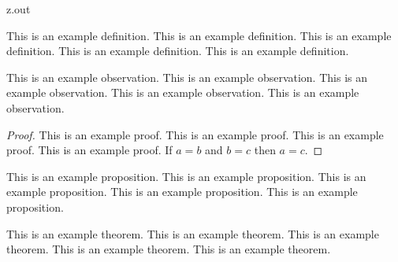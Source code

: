 \begin{VerbatimOut}{z.out}

\index{\verb+\begin{definition}+}
\begin{definition}
  This is an example definition.
  This is an example definition.
  This is an example definition.
  This is an example definition.
  This is an example definition.
\end{definition}

\index{\verb+\begin{observation}+}
\begin{observation}
  This is an example observation.
  This is an example observation.
  This is an example observation.
  This is an example observation.
  This is an example observation.
\end{observation}

\index{\verb+\begin{proof}+}
\begin{proof}
  This is an example proof.
  This is an example proof.
  This is an example proof.
  This is an example proof.
  If \(a = b\) and \(b = c\) then \(a = c\).
\end{proof}

\index{\verb+\begin{proposition}+}
\begin{proposition}
  This is an example proposition.
  This is an example proposition.
  This is an example proposition.
  This is an example proposition.
  This is an example proposition.
\end{proposition}

\index{\verb+\begin{theorem}+}
\begin{theorem}
  This is an example theorem.
  This is an example theorem.
  This is an example theorem.
  This is an example theorem.
  This is an example theorem.
\end{theorem}
\end{VerbatimOut}

\MyIO


